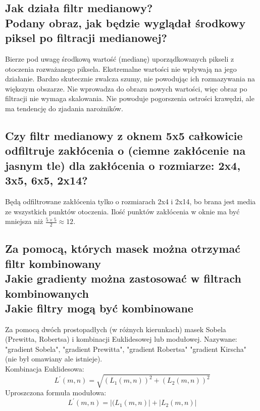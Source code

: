\documentclass[a4paper, 12pt, titlepage]{article}
\begin{document}
\subsection{Jak działa filtr medianowy? \\ Podany obraz, jak będzie wyglądał środkowy piksel po filtracji medianowej?}
Bierze pod uwagę środkową wartość (medianę) uporządkowanych pikseli z otoczenia rozważanego piksela. Ekstremalne wartości nie wpływają na jego działanie. Bardzo skutecznie zwalcza szumy, nie powodując ich rozmazywania na większym obszarze. Nie wprowadza do obrazu nowych wartości, więc obraz po filtracji nie wymaga skalowania. Nie powoduje pogorszenia ostrości krawędzi, ale ma tendencję do zjadania narożników.

\subsection{Czy filtr medianowy z oknem 5x5 całkowicie odfiltruje zakłócenia o (ciemne zakłócenie na jasnym tle) dla zakłócenia o rozmiarze: 2x4, 3x5, 6x5, 2x14?}
Będą odfiltrowane zakłócenia tylko o rozmiarach 2x4 i 2x14, bo brana jest media ze wszystkich punktów otoczenia. Ilość punktów zakłócenia w oknie ma być mniejsza niż $\frac{5\times5}{2}\approx12$.

\subsection{Za pomocą, których masek można otrzymać filtr kombinowany \\ Jakie gradienty można zastosować w filtrach kombinowanych \\ Jakie filtry mogą być kombinowane}
Za pomocą dwóch prostopadłych (w różnych kierunkach) masek Sobela (Prewitta, Robertsa) i kombinacji Euklidesowej lub modułowej. Nazywane: "gradient Sobela", "gradient Prewitta", "gradient Robertsa" "gradient Kirscha" (nie był omawiany ale istnieje). \\
Kombinacja Euklidesowa:
$$ L^{\prime}(m,n) = \sqrt{(L_{1}(m,n))^2+(L_{2}(m,n))^2} $$
Uproszczona formuła modułowa:
$$ L^{\prime}(m,n) = |(L_{1}(m,n)|+|L_{2}(m,n)| $$
\end{document}
